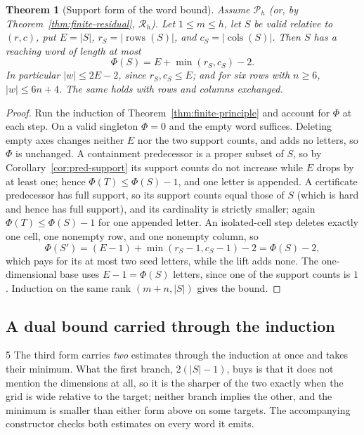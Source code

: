 \documentclass[11pt,letterpaper]{article}
\numberwithin{equation}{section}
\newtheorem{theorem}{Theorem}[section]
\theoremstyle{definition}
\theoremstyle{remark}
\newcommand{\suppR}{\operatorname{rows}}
\newcommand{\suppC}{\operatorname{cols}}
\begin{document}
\begin{theorem}[Support form of the word bound]\label{thm:support-bound}
Assume $\mathcal P_h$ (or, by Theorem~\ref{thm:finite-residual},
$\mathcal R_h$). Let $1\le m\le h$, let $S$ be valid relative to $(r,c)$, put
$E=|S|$, $r_S=|\suppR(S)|$, and $c_S=|\suppC(S)|$. Then $S$ has a reaching
word of length at most
\begin{equation}\label{eq:support-bound}
 \Phi(S)=E+\min(r_S,c_S)-2 .
\end{equation}
In particular $|w|\le2E-2$, since $r_S,c_S\le E$; and for six rows with
$n\ge6$, $|w|\le6n+4$. The same holds with rows and columns exchanged.
\end{theorem}
\begin{proof}
Run the induction of Theorem~\ref{thm:finite-principle} and account for
$\Phi$ at each step. On a valid singleton $\Phi=0$ and the empty word
suffices. Deleting empty axes changes neither $E$ nor the two support counts,
and adds no letters, so $\Phi$ is unchanged. A containment predecessor is a
proper subset of $S$, so by Corollary~\ref{cor:pred-support} its support
counts do not increase while $E$ drops by at least one; hence
$\Phi(T)\le\Phi(S)-1$, and one letter is appended. A certificate predecessor
has full support, so its support counts equal those of $S$ (which is hard and
hence has full support), and its cardinality is strictly smaller; again
$\Phi(T)\le\Phi(S)-1$ for one appended letter. An isolated-cell step deletes
exactly one cell, one nonempty row, and one nonempty column, so
\[
 \Phi(S')=(E-1)+\min(r_S-1,c_S-1)-2=\Phi(S)-2,
\]
which pays for its at most two seed letters, while the lift adds none. The
one-dimensional base uses $E-1=\Phi(S)$ letters, since one of the support
counts is $1$. Induction on the same rank $(m+n,|S|)$ gives the bound.
\end{proof}

\subsection{A dual bound carried through the induction}
\label{sec:dual-bound}
\begin{variantbox}{5}
The third form carries \emph{two} estimates through the induction at once and
takes their minimum. What the first branch, $2(|S|-1)$, buys is that it does
not mention the dimensions at all, so it is the sharper of the two exactly
when the grid is wide relative to the target; neither branch implies the
other, and the minimum is smaller than either form above on some targets. The
accompanying constructor checks both estimates on every word it emits.
\end{variantbox}
\end{document}

